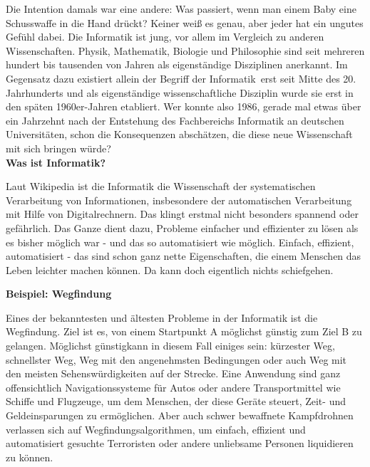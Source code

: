 {Die Intention damals war eine andere: Was passiert, wenn man einem Baby eine Schusswaffe in die Hand drückt? Keiner weiß es genau, aber jeder hat ein ungutes Gefühl dabei.
    Die Informatik ist jung, vor allem im Vergleich zu anderen Wissenschaften. Physik, Mathematik, Biologie und Philosophie sind seit mehreren hundert bis tausenden von Jahren als eigenständige Disziplinen anerkannt.  Im Gegensatz dazu existiert allein der Begriff der \glqq Informatik\grqq~erst seit Mitte des 20. Jahrhunderts und als eigenständige wissenschaftliche Disziplin wurde sie erst in den späten 1960er-Jahren etabliert.
    Wer konnte also 1986, gerade mal etwas über ein Jahrzehnt nach der Entstehung des Fachbereichs Informatik an deutschen Universitäten, schon die Konsequenzen abschätzen, die diese neue Wissenschaft mit sich bringen würde?\\

    \textbf{Was ist Informatik?}

    Laut Wikipedia ist die Informatik die \glqq Wissenschaft der systematischen Verarbeitung von Informationen, insbesondere der automatischen Verarbeitung mit Hilfe von Digitalrechnern\grqq.
    Das klingt erstmal nicht besonders spannend oder gefährlich. Das Ganze dient dazu, Probleme einfacher und effizienter  zu lösen als es bisher möglich war - und das so automatisiert wie möglich. Einfach, effizient, automatisiert - das sind schon ganz nette Eigenschaften, die einem Menschen das Leben leichter machen können. Da kann doch eigentlich nichts schiefgehen.\\

    \columnbreak

    \textbf{Beispiel: Wegfindung}

    Eines der bekanntesten und ältesten Probleme in der Informatik ist die Wegfindung. Ziel ist es, von einem Startpunkt A möglichst günstig zum Ziel B zu gelangen. \glqq Möglichst günstig\grqq kann in diesem Fall einiges sein: kürzester Weg, schnellster Weg, Weg mit den angenehmsten Bedingungen oder auch Weg mit den meisten Sehenswürdigkeiten auf der Strecke. Eine Anwendung sind ganz offensichtlich Navigationssysteme für Autos oder andere Transportmittel wie Schiffe und Flugzeuge, um dem Menschen, der diese Geräte steuert, Zeit- und Geldeinsparungen zu ermöglichen. Aber auch schwer bewaffnete Kampfdrohnen verlassen sich auf Wegfindungsalgorithmen, um einfach, effizient und automatisiert gesuchte Terroristen oder andere unliebsame Personen liquidieren zu können.\\

}
